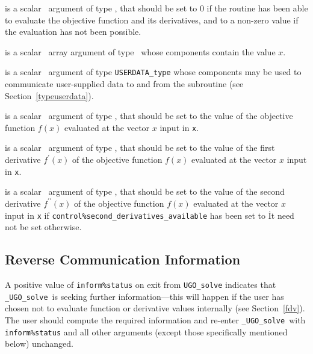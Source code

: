 \documentclass{galahad}
\newcommand{\packagename}{UGO}
\newcommand{\fullpackagename}{\libraryname\_\packagename}
\newcommand{\solver}{{\tt \fullpackagename\_solve}}
\begin{document}
\begin{description}
 is a scalar \intentout\ argument of type \integer,
that should be set to 0 if the routine has been able to evaluate
the objective function and its derivatives,
and to a non-zero value if the evaluation has not been possible.

 is a scalar \intentin\ array argument of type \realdp\
whose components contain the value $x$.

 is a scalar \intentinout\ argument of type
{\tt USERDATA\_type} whose components may be used
to communicate user-supplied data to and from the
subroutine (see Section~\ref{typeuserdata}).

 is a scalar \intentout\ argument of type \realdp,
that should be set to the value of the objective function $f(x)$
evaluated at the vector $x$ input in {\tt x}.

 is a scalar \intentout\ argument of type \realdp,
that should be set to the value of the first derivative
$f^{\prime}(x)$ of the objective function $f(x)$
evaluated at the vector $x$ input in {\tt x}.

 is a scalar \intentout\ argument of type \realdp,
that should be set to the value of the second derivative
$f^{\prime\prime}(x)$ of the objective function $f(x)$
evaluated at the vector $x$ input in {\tt x} if
{\tt control\%second\_derivatives\_available} has been set to \true\.
It need not be set otherwise.

\end{description}


\subsection{\label{reverse}Reverse Communication Information}

A positive value of {\tt inform\%status} on exit from
{\tt \packagename\_solve}
indicates that
\solver\ is seeking further information---this will happen
if the user has chosen not to evaluate function or
derivative values internally (see Section~\ref{fdv}).
The user should compute the required information and re-enter \solver\
with {\tt inform\%status} and all other arguments (except those specifically
mentioned below) unchanged.
\end{document}
